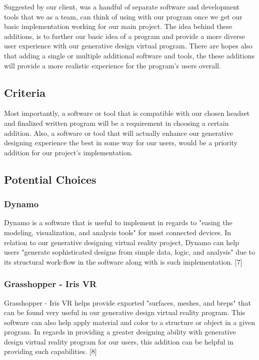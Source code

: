 \documentclass[letterpaper,10pt,onecolumn,compsoc]{IEEEtran}
\begin{document}
\noindent
Suggested by our client, was a handful of separate software and development tools that we as a team, can think of using with our program once we get our basic implementation working for our main project. The idea behind these additions, is to further our basic idea of a program and provide a more diverse user experience with our generative design virtual program. There are hopes also that adding a single or multiple additional software and tools, the these additions will provide a more realistic experience for the program's users overall.

\subsection{Criteria}

\noindent
Most importantly, a software or tool that is compatible with our chosen headset and finalized written program will be a requirement in choosing a certain addition. Also, a software or tool that will actually enhance our generative designing experience the best in some way for our users, would be a priority addition for our project's implementation.  

\subsection{Potential Choices}
\subsubsection{Dynamo}


\noindent
Dynamo is a software that is useful to implement in regards to "easing the modeling, visualization, and analysis tools" for most connected devices. In relation to our generative designing virtual reality project, Dynamo can help users "generate sophisticated designs from simple data, logic, and analysis" due to its structural work-flow in the software along with is such implementation. [7]

\subsubsection{Grasshopper - Iris VR}


\noindent
Grasshopper - Iris VR helps provide exported "surfaces, meshes, and breps" that can be found very useful in our generative design virtual reality program. This software can also help apply material and color to a structure or object in a given program. In regards in providing a greater designing ability with generative design virtual reality program for our users, this addition can be helpful in providing such capabilities. [8] 
\end{document}
